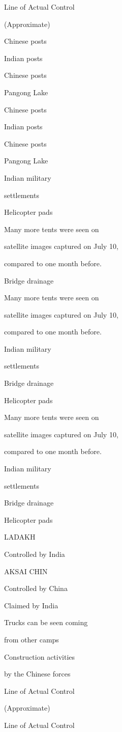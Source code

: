Line of Actual Control

(Approximate)

Chinese posts

Indian posts

Chinese posts

Pangong Lake

Chinese posts

Indian posts

Chinese posts

Pangong Lake

Indian military

settlements

Helicopter pads

Many more tents were seen on

satellite images captured on July 10,

compared to one month before.

Bridge drainage

Many more tents were seen on

satellite images captured on July 10,

compared to one month before.

Indian military

settlements

Bridge drainage

Helicopter pads

Many more tents were seen on

satellite images captured on July 10,

compared to one month before.

Indian military

settlements

Bridge drainage

Helicopter pads

LADAKH

Controlled by India

AKSAI CHIN

Controlled by China

Claimed by India

Trucks can be seen coming

from other camps

Construction activities

by the Chinese forces

Line of Actual Control

(Approximate)

Line of Actual Control


